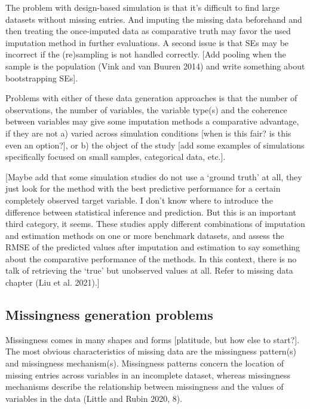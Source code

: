 \documentclass[
]{article}
\begin{document}
The problem with design-based simulation is that it's difficult to find
large datasets without missing entries. And imputing the missing data
beforehand and then treating the once-imputed data as comparative truth
may favor the used imputation method in further evaluations. A second
issue is that SEs may be incorrect if the (re)sampling is not handled
correctly. {[}Add pooling when the sample is the population (Vink and
van Buuren 2014) and write something about bootstrapping SEs{]}.

Problems with either of these data generation approaches is that the
number of observations, the number of variables, the variable type(s)
and the coherence between variables may give some imputation methods a
comparative advantage, if they are not a) varied across simulation
conditions {[}when is this fair? is this even an option?{]}, or b) the
object of the study {[}add some examples of simulations specifically
focused on small samples, categorical data, etc.{]}.

{[}Maybe add that some simulation studies do not use a `ground truth' at
all, they just look for the method with the best predictive performance
for a certain completely observed target variable. I don't know where to
introduce the difference between statistical inference and prediction.
But this is an important third category, it seems. These studies apply
different combinations of imputation and estimation methods on one or
more benchmark datasets, and assess the RMSE of the predicted values
after imputation and estimation to say something about the comparative
performance of the methods. In this context, there is no talk of
retrieving the `true' but unobserved values at all. Refer to missing
data chapter (Liu et al. 2021).{]}

\hypertarget{missingness-generation-problems}{%
\subsection{Missingness generation
problems}\label{missingness-generation-problems}}

Missingness comes in many shapes and forms {[}platitude, but how else to
start?{]}. The most obvious characteristics of missing data are the
missingness pattern(s) and missingness mechanism(s). Missingness
patterns concern the location of missing entries across variables in an
incomplete dataset, whereas missingness mechanisms describe the
relationship between missingness and the values of variables in the data
(Little and Rubin 2020, 8).
\end{document}

